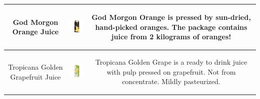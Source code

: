\begin{table}[!ht]
{\begin{tabular}{c c c}
         
        \toprule
         \multicolumn{1}{p{1.5cm}}{\vspace{-17mm} {\footnotesize God Morgon Orange Juice} } &
          \includegraphics[width=21mm, height=21mm]{PaperB/appendix/figures/iconic_images/God-Morgon-Orange-Juice_Clean.jpg}  & 
         \multicolumn{1}{p{12cm}}{\vspace{-15mm} {\footnotesize God Morgon Orange is pressed by sun-dried, hand-picked oranges. The package contains juice from 2 kilograms of oranges!} } \\
         
         \toprule
         \multicolumn{1}{p{1.5cm}}{\vspace{-18mm} {\footnotesize Tropicana Golden Grapefruit Juice} } &
          \includegraphics[width=21mm, height=21mm]{PaperB/appendix/figures/iconic_images/Tropicana-Golden-Grapefruit_Clean.jpg}  & 
         \multicolumn{1}{p{12cm}}{\vspace{-17mm} {\footnotesize Tropicana Golden Grape is a ready to drink juice with pulp pressed on grapefruit. Not from concentrate. Mildly pasteurized.} } \\
         
        \toprule
    \end{tabular}
	}

    \label{paperB:tab:grocerystore_dataset_descriptions}
\end{table}

\clearpage


